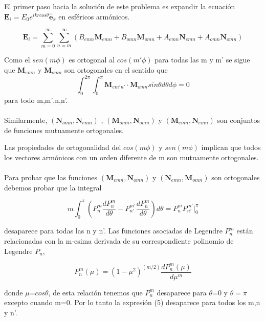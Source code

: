 \documentclass[graybox]{svmult}
\begin{document}
El primer paso hacia la solución de este problema es expandir la ecuación $\textbf{E}_{i} = E_{0}e^{ikrcos\theta}\hat{\textbf{e}}_{x}$ en esféricos armónicos.

\begin{equation}
    \textbf{E}_{i} = \sum_{m=0}^{\infty}\sum_{n=m}^{\infty}(B_{emn}\textbf{M}_{emn}+B_{omn}\textbf{M}_{omn}+A_{emn}\textbf{N}_{emn}+A_{omn}\textbf{N}_{omn})
\end{equation}

Como el $sen( m\phi)$ es ortogonal al $cos( m'\phi)$ para todas las m y m' se sigue que $\textbf{M}_{emn}$ y $\textbf{M}_{omn}$ son ortogonales en el sentido que
\begin{equation}
    \int_{0}^{2\pi}\int_{0}^{\pi} \textbf{M}_{em'n'} \cdot \textbf{M}_{omn} sin\theta d\theta d\phi = 0 
\end{equation} 
para todo m,m',n,n'.
\\ \\
Similarmente, $(\textbf{N}_{omn},\textbf{N}_{emn})$ , $(\textbf{M}_{omn},\textbf{N}_{omn})$ y $(\textbf{M}_{emn},\textbf{N}_{emn})$ son conjuntos de funciones mutuamente ortogonales.

Las propiedades de ortogonalidad del $cos( m\phi)$ y $sen( m\phi)$ implican que todos los vectores armónicos con un orden diferente de m son mutuamente ortogonales.
\\ \\
Para probar que las funciones $(\textbf{M}_{emn},\textbf{N}_{omn})$ y $(\textbf{N}_{emn},\textbf{M}_{omn})$ son ortogonales debemos probar que la integral 

\begin{equation}
    m \int_{0}^{\pi} (P_{n}^{m}\frac{dP_{n}^{m}}{d\theta}-P_{n'}^{m'}\frac{dP_{n}^{m}}{d\theta})d\theta = P_{n}^{m}P_{n'}^{m'} \Big|_0^\pi
\end{equation}

desaparece para todas las n y n'. Las funciones asociadas de Legendre $P_{n}^{m}$ están relacionadas con la m-esima derivada de su correspondiente polinomio de Legendre $P_{n}$,

\begin{equation}
    P_{n}^{m}(\mu)=(1-\mu^2)^{(m/2)}\frac{dP_{n}^{m}(\mu)}{d\mu^{m}}
\end{equation}

donde $\mu$=$cos\theta$, de esta relación tenemos que $P_{n}^{m}$ desaparece para $\theta$=0 y $\theta=\pi$ excepto cuando m=0. Por lo tanto la expresión (5) desaparece para todos los m,n y n'.
\end{document}
